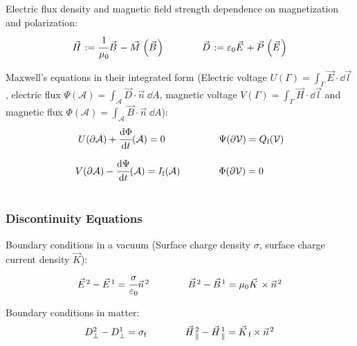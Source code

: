 		\noindent
		Electric flux density and magnetic field strength dependence on magnetization and polarization:
		\begin{equation} \label{Eq:FluxDensityFieldStrength}
			\begin{array}{cc}
				\vec{H} := \cfrac{1}{\mu_0}\Vec{B} - \vec{M}\left(\vec{B}\right)
				& \hsp \vec{D} := \varepsilon_0\vec{E} + \vec{P}\left(\vec{E}\right)
			\end{array}
		\end{equation}


		\noindent
		Maxwell's equations in their integrated form (Electric voltage $U(\Gamma)=\int_\Gamma \vec{E}\cdot\dd\vec{l}$, electric flux $\Psi(\mathcal{A})=\int_\mathcal{A}\vec{D}\cdot\vec{n}\;\dd A$, magnetic voltage $V(\Gamma)=\int_\Gamma \vec{H}\cdot\dd\vec{l}$ and magnetic flux $\Phi(\mathcal{A})=\int_\mathcal{A}\vec{B}\cdot\vec{n}\;\dd A$):
		\begin{equation}
			\begin{array}{rl}
				U(\partial \mathcal{A}) + \cfrac{\dd\Phi}{\dd t}(\mathcal{A}) = 0\phantom{(\mathcal{A})}
				& \hsp \Psi(\partial\mathcal{V}) = Q_\text{f}(\mathcal{V}) \\ \xrowht{40pt}
				V(\partial \mathcal{A}) - \cfrac{\dd \Psi}{\dd t}(\mathcal{A}) = I_\text{f}(\mathcal{A})
				& \hsp \Phi(\partial\mathcal{V}) = 0
			\end{array}
		\end{equation}

		\subsubsection{Discontinuity Equations}
			\noindent
			Boundary conditions in a vacuum (Surface charge density $\sigma$, surface charge current density $\vec{K}$):
			\begin{equation}
				\begin{array}{cc}
					\vec{E}^2 - \vec{E}^1 = \cfrac{\sigma}{\varepsilon_0}\Vec{n}^2
					& \hsp \vec{B}^2 - \vec{B}^1 = \mu_0\vec{K}\times\Vec{n}^2
				\end{array}
			\end{equation}

			\noindent
			Boundary conditions in matter:
			\begin{equation}
				\begin{array}{cc}
					D_\perp^2 - D_\perp^1 = \sigma_\text{f}
					& \hsp \vec{H}_\parallel^2 - \vec{H}_\parallel^1 = \vec{K}_\text{f}\times\Vec{n}^2
				\end{array}
			\end{equation}

